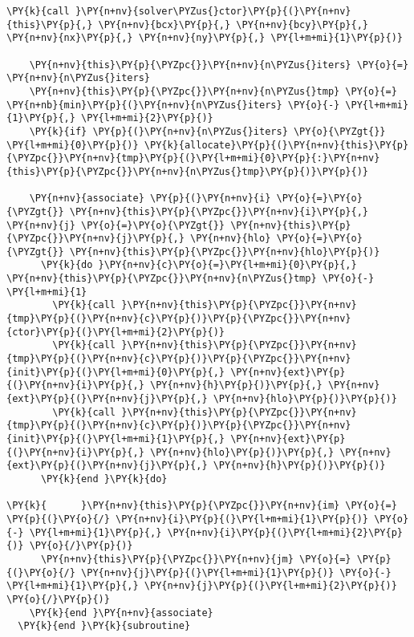 \begin{Verbatim}[commandchars=\\\{\}]
    \PY{k}{call }\PY{n+nv}{solver\PYZus{}ctor}\PY{p}{(}\PY{n+nv}{this}\PY{p}{,} \PY{n+nv}{bcx}\PY{p}{,} \PY{n+nv}{bcy}\PY{p}{,} \PY{n+nv}{nx}\PY{p}{,} \PY{n+nv}{ny}\PY{p}{,} \PY{l+m+mi}{1}\PY{p}{)}

    \PY{n+nv}{this}\PY{p}{\PYZpc{}}\PY{n+nv}{n\PYZus{}iters} \PY{o}{=} \PY{n+nv}{n\PYZus{}iters}
    \PY{n+nv}{this}\PY{p}{\PYZpc{}}\PY{n+nv}{n\PYZus{}tmp} \PY{o}{=} \PY{n+nb}{min}\PY{p}{(}\PY{n+nv}{n\PYZus{}iters} \PY{o}{-} \PY{l+m+mi}{1}\PY{p}{,} \PY{l+m+mi}{2}\PY{p}{)}
    \PY{k}{if} \PY{p}{(}\PY{n+nv}{n\PYZus{}iters} \PY{o}{\PYZgt{}} \PY{l+m+mi}{0}\PY{p}{)} \PY{k}{allocate}\PY{p}{(}\PY{n+nv}{this}\PY{p}{\PYZpc{}}\PY{n+nv}{tmp}\PY{p}{(}\PY{l+m+mi}{0}\PY{p}{:}\PY{n+nv}{this}\PY{p}{\PYZpc{}}\PY{n+nv}{n\PYZus{}tmp}\PY{p}{)}\PY{p}{)} 

    \PY{n+nv}{associate} \PY{p}{(}\PY{n+nv}{i} \PY{o}{=}\PY{o}{\PYZgt{}} \PY{n+nv}{this}\PY{p}{\PYZpc{}}\PY{n+nv}{i}\PY{p}{,} \PY{n+nv}{j} \PY{o}{=}\PY{o}{\PYZgt{}} \PY{n+nv}{this}\PY{p}{\PYZpc{}}\PY{n+nv}{j}\PY{p}{,} \PY{n+nv}{hlo} \PY{o}{=}\PY{o}{\PYZgt{}} \PY{n+nv}{this}\PY{p}{\PYZpc{}}\PY{n+nv}{hlo}\PY{p}{)}
      \PY{k}{do }\PY{n+nv}{c}\PY{o}{=}\PY{l+m+mi}{0}\PY{p}{,} \PY{n+nv}{this}\PY{p}{\PYZpc{}}\PY{n+nv}{n\PYZus{}tmp} \PY{o}{-} \PY{l+m+mi}{1}
        \PY{k}{call }\PY{n+nv}{this}\PY{p}{\PYZpc{}}\PY{n+nv}{tmp}\PY{p}{(}\PY{n+nv}{c}\PY{p}{)}\PY{p}{\PYZpc{}}\PY{n+nv}{ctor}\PY{p}{(}\PY{l+m+mi}{2}\PY{p}{)}
        \PY{k}{call }\PY{n+nv}{this}\PY{p}{\PYZpc{}}\PY{n+nv}{tmp}\PY{p}{(}\PY{n+nv}{c}\PY{p}{)}\PY{p}{\PYZpc{}}\PY{n+nv}{init}\PY{p}{(}\PY{l+m+mi}{0}\PY{p}{,} \PY{n+nv}{ext}\PY{p}{(}\PY{n+nv}{i}\PY{p}{,} \PY{n+nv}{h}\PY{p}{)}\PY{p}{,} \PY{n+nv}{ext}\PY{p}{(}\PY{n+nv}{j}\PY{p}{,} \PY{n+nv}{hlo}\PY{p}{)}\PY{p}{)}
        \PY{k}{call }\PY{n+nv}{this}\PY{p}{\PYZpc{}}\PY{n+nv}{tmp}\PY{p}{(}\PY{n+nv}{c}\PY{p}{)}\PY{p}{\PYZpc{}}\PY{n+nv}{init}\PY{p}{(}\PY{l+m+mi}{1}\PY{p}{,} \PY{n+nv}{ext}\PY{p}{(}\PY{n+nv}{i}\PY{p}{,} \PY{n+nv}{hlo}\PY{p}{)}\PY{p}{,} \PY{n+nv}{ext}\PY{p}{(}\PY{n+nv}{j}\PY{p}{,} \PY{n+nv}{h}\PY{p}{)}\PY{p}{)}
      \PY{k}{end }\PY{k}{do}

\PY{k}{      }\PY{n+nv}{this}\PY{p}{\PYZpc{}}\PY{n+nv}{im} \PY{o}{=} \PY{p}{(}\PY{o}{/} \PY{n+nv}{i}\PY{p}{(}\PY{l+m+mi}{1}\PY{p}{)} \PY{o}{-} \PY{l+m+mi}{1}\PY{p}{,} \PY{n+nv}{i}\PY{p}{(}\PY{l+m+mi}{2}\PY{p}{)} \PY{o}{/}\PY{p}{)}
      \PY{n+nv}{this}\PY{p}{\PYZpc{}}\PY{n+nv}{jm} \PY{o}{=} \PY{p}{(}\PY{o}{/} \PY{n+nv}{j}\PY{p}{(}\PY{l+m+mi}{1}\PY{p}{)} \PY{o}{-} \PY{l+m+mi}{1}\PY{p}{,} \PY{n+nv}{j}\PY{p}{(}\PY{l+m+mi}{2}\PY{p}{)} \PY{o}{/}\PY{p}{)}
    \PY{k}{end }\PY{n+nv}{associate}
  \PY{k}{end }\PY{k}{subroutine}


\end{Verbatim}
